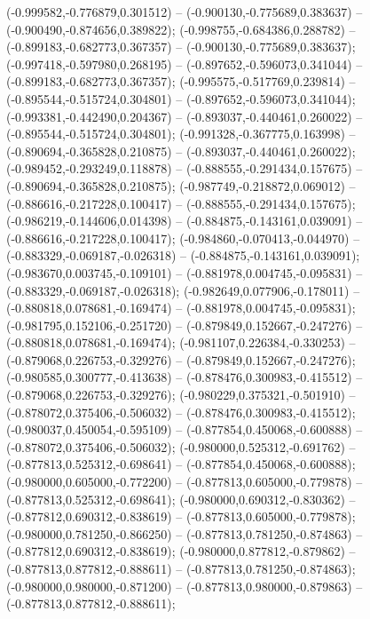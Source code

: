  (-0.999582,-0.776879,0.301512) -- (-0.900130,-0.775689,0.383637) -- (-0.900490,-0.874656,0.389822);
 (-0.998755,-0.684386,0.288782) -- (-0.899183,-0.682773,0.367357) -- (-0.900130,-0.775689,0.383637);
 (-0.997418,-0.597980,0.268195) -- (-0.897652,-0.596073,0.341044) -- (-0.899183,-0.682773,0.367357);
 (-0.995575,-0.517769,0.239814) -- (-0.895544,-0.515724,0.304801) -- (-0.897652,-0.596073,0.341044);
 (-0.993381,-0.442490,0.204367) -- (-0.893037,-0.440461,0.260022) -- (-0.895544,-0.515724,0.304801);
 (-0.991328,-0.367775,0.163998) -- (-0.890694,-0.365828,0.210875) -- (-0.893037,-0.440461,0.260022);
 (-0.989452,-0.293249,0.118878) -- (-0.888555,-0.291434,0.157675) -- (-0.890694,-0.365828,0.210875);
 (-0.987749,-0.218872,0.069012) -- (-0.886616,-0.217228,0.100417) -- (-0.888555,-0.291434,0.157675);
 (-0.986219,-0.144606,0.014398) -- (-0.884875,-0.143161,0.039091) -- (-0.886616,-0.217228,0.100417);
 (-0.984860,-0.070413,-0.044970) -- (-0.883329,-0.069187,-0.026318) -- (-0.884875,-0.143161,0.039091);
 (-0.983670,0.003745,-0.109101) -- (-0.881978,0.004745,-0.095831) -- (-0.883329,-0.069187,-0.026318);
 (-0.982649,0.077906,-0.178011) -- (-0.880818,0.078681,-0.169474) -- (-0.881978,0.004745,-0.095831);
 (-0.981795,0.152106,-0.251720) -- (-0.879849,0.152667,-0.247276) -- (-0.880818,0.078681,-0.169474);
 (-0.981107,0.226384,-0.330253) -- (-0.879068,0.226753,-0.329276) -- (-0.879849,0.152667,-0.247276);
 (-0.980585,0.300777,-0.413638) -- (-0.878476,0.300983,-0.415512) -- (-0.879068,0.226753,-0.329276);
 (-0.980229,0.375321,-0.501910) -- (-0.878072,0.375406,-0.506032) -- (-0.878476,0.300983,-0.415512);
 (-0.980037,0.450054,-0.595109) -- (-0.877854,0.450068,-0.600888) -- (-0.878072,0.375406,-0.506032);
 (-0.980000,0.525312,-0.691762) -- (-0.877813,0.525312,-0.698641) -- (-0.877854,0.450068,-0.600888);
 (-0.980000,0.605000,-0.772200) -- (-0.877813,0.605000,-0.779878) -- (-0.877813,0.525312,-0.698641);
 (-0.980000,0.690312,-0.830362) -- (-0.877812,0.690312,-0.838619) -- (-0.877813,0.605000,-0.779878);
 (-0.980000,0.781250,-0.866250) -- (-0.877813,0.781250,-0.874863) -- (-0.877812,0.690312,-0.838619);
 (-0.980000,0.877812,-0.879862) -- (-0.877813,0.877812,-0.888611) -- (-0.877813,0.781250,-0.874863);
 (-0.980000,0.980000,-0.871200) -- (-0.877813,0.980000,-0.879863) -- (-0.877813,0.877812,-0.888611);
